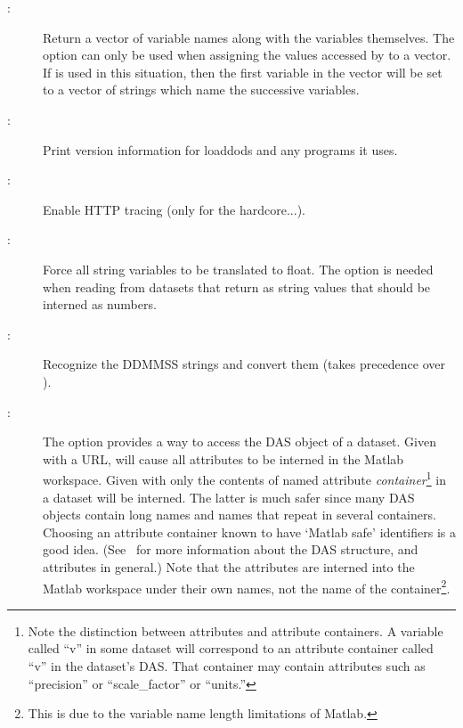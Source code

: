 \begin{description}
\begin{description}
\item[:] Return a vector of variable names along with the
  variables themselves.  The  option can only be used when
  assigning the values accessed by  to a vector. If
   is used in this situation, then the first variable in the
  vector will be set to a vector of strings which name the successive
  variables.

\item[:] Print version information for loaddods and any
  programs it uses. 

\item[:] Enable HTTP tracing (only for the hardcore...).

\item[:] Force all string variables to be translated to float.
  The  option is needed when reading from datasets that return
  as string values that should be interned as numbers.


\item[:] Recognize the DDMMSS strings and convert them (takes
  precedence over ).
  
\item[:] The  option provides a way to access the DAS
  object of a dataset.  Given with a URL,  will cause all
  attributes to be interned in the Matlab workspace. Given with
   only the contents of named attribute
  \emph{container}\footnote{Note the distinction between attributes
    and attribute containers.  A variable called ``v'' in some dataset
    will correspond to an attribute container called ``v'' in the
    dataset's DAS.  That container may contain attributes such as
    ``precision'' or ``scale\_factor'' or ``units.''} in a dataset
  will be interned. The latter is much safer since many DAS objects
  contain long names and names that repeat in several containers.
  Choosing an attribute container known to have `Matlab safe'
  identifiers is a good idea. (See \OPDuser\ for more information
  about the DAS structure, and attributes in general.)  Note that the
  attributes are interned into the Matlab workspace under their own
  names, not the name of the container\footnote{This is due to the
    variable name length limitations of Matlab.}.


\end{description}
\end{description}
